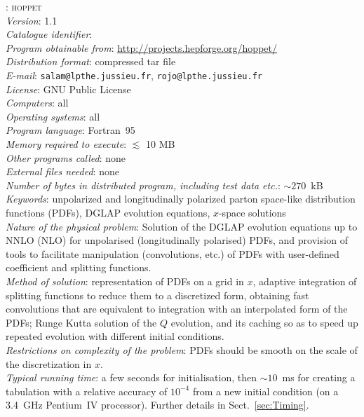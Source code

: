 \documentclass[12pt]{article}
\newcommand{\hoppet}{\textsc{hoppet}\xspace}
\begin{document}
: \hoppet \\[2mm]
{\em Version\/}: 1.1 \\[2mm]
{\em Catalogue identifier\/}: \\[2mm]
{\em Program obtainable from\/}:
\url{http://projects.hepforge.org/hoppet/}
\\[2mm]
{\em Distribution format\/}: compressed tar file \\[2mm]
{\em E-mail\/}: {\tt salam@lpthe.jussieu.fr}, 
{\tt rojo@lpthe.jussieu.fr} \\[2mm]
{\em License\/}: GNU Public License \\[2mm]
{\em Computers\/}: all \\[2mm]
{\em Operating systems\/}: all \\[2mm]
{\em Program language\/}: Fortran~95 \\[2mm]
{\em Memory required to execute\/}:  $\lesssim$ 10 MB \\[2mm]
{\em Other programs called\/}: none \\[2mm]
{\em External files needed\/}: none \\[2mm]
{\em Number of bytes in distributed program, including test data
  etc.\/}: $\sim 270$~kB\\[2mm]
{\em Keywords\/}: unpolarized and longitudinally polarized parton
space-like distribution functions (PDFs), DGLAP evolution equations,
$x$-space solutions
\\[2mm]
{\em Nature of the physical problem\/}: Solution of the DGLAP
evolution equations up to NNLO (NLO) for unpolarised (longitudinally
polarised) PDFs, and provision of tools to facilitate manipulation
(convolutions, etc.) of PDFs with user-defined coefficient and
splitting functions.
\\[2mm]
%
{\em Method of solution\/}:
representation of PDFs on a grid in $x$, adaptive integration of
splitting functions to reduce them to a discretized
form, obtaining fast
convolutions that are equivalent to integration with an interpolated
form of the PDFs; Runge Kutta solution of the $Q$ evolution, and
its caching so as to speed up repeated evolution with different
initial conditions.
\\[2mm]
{\em Restrictions on complexity of the problem\/}: PDFs should be
smooth on the scale of the discretization in $x$.
\\[2mm]
{\em Typical running time\/}: a few seconds for initialisation, then
$\sim 10$~ms for creating a tabulation with a relative accuracy of
$10^{-4}$ from a new initial condition (on a 3.4~GHz Pentium~IV
processor). Further details in Sect.~\ref{sec:Timing}.
\end{document}
